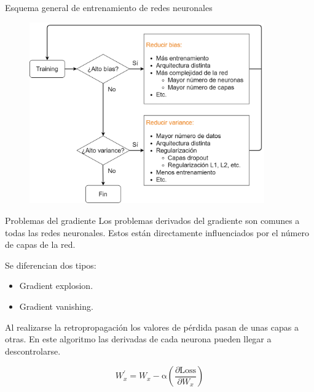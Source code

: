 \begin{frame}{Esquema general de entrenamiento de redes neuronales}
\begin{figure}
\centering
    \includegraphics[width=0.9\textwidth]{Slides/figures/Tema 3/NNTrainingScheme.png}
\end{figure}
\end{frame}

\begin{frame}{Problemas del gradiente}
Los problemas \alert{derivados del gradiente} son comunes a todas las redes neuronales. Estos están \alert{directamente influenciados} por el número de capas de la red.

Se diferencian dos tipos:
\begin{itemize}
    \item Gradient explosion.
    \item Gradient vanishing.
\end{itemize}

Al realizarse la \alert{retropropagación} los \alert{valores de pérdida} pasan de unas capas a otras. En este algoritmo las derivadas de cada neurona pueden llegar a \alert{descontrolarse}.

\begin{equation}
    W_{x}^{\prime}=W_{x}-\mathrm{\alpha}\left(\frac{\partial \text {Loss}}{\partial W_{x}}\right)
\end{equation}
\end{frame}

